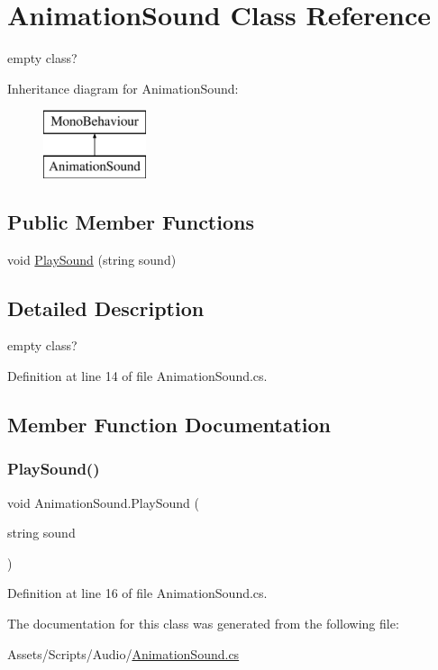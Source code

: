 \hypertarget{class_animation_sound}{}\section{Animation\+Sound Class Reference}
\label{class_animation_sound}


empty class?  


Inheritance diagram for Animation\+Sound\+:\begin{figure}[H]
\begin{center}
\leavevmode
\includegraphics[height=2.000000cm]{class_animation_sound}
\end{center}
\end{figure}
\subsection*{Public Member Functions}
\begin{DoxyCompactItemize}
\item 
void \mbox{\hyperlink{class_animation_sound_a6cfd7359b95fb28ef74ee2d87cefdaaa}{Play\+Sound}} (string sound)
\end{DoxyCompactItemize}


\subsection{Detailed Description}
empty class? 



Definition at line 14 of file Animation\+Sound.\+cs.



\subsection{Member Function Documentation}
\mbox{\label{class_animation_sound_a6cfd7359b95fb28ef74ee2d87cefdaaa}} 
\subsubsection{\texorpdfstring{Play\+Sound()}{PlaySound()}}
{\footnotesize\ttfamily void Animation\+Sound.\+Play\+Sound (\begin{DoxyParamCaption}\item[{string}]{sound }\end{DoxyParamCaption})}



Definition at line 16 of file Animation\+Sound.\+cs.



The documentation for this class was generated from the following file\+:\begin{DoxyCompactItemize}
\item 
Assets/\+Scripts/\+Audio/\mbox{\hyperlink{_animation_sound_8cs}{Animation\+Sound.\+cs}}\end{DoxyCompactItemize}
